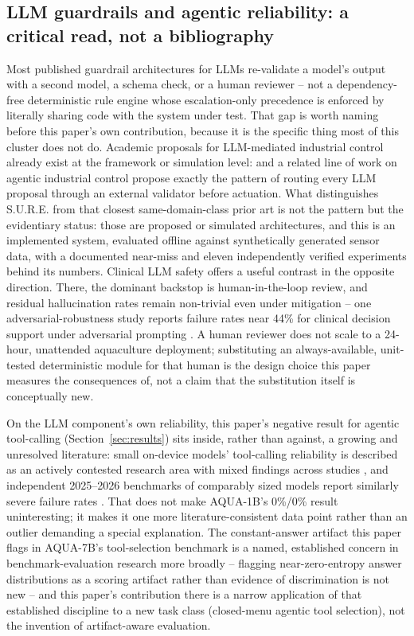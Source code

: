 \subsection{LLM guardrails and agentic reliability: a critical read, not a bibliography}

Most published guardrail architectures for LLMs re-validate a model's output with a second model,
a schema check, or a human reviewer -- not a dependency-free deterministic rule engine whose
escalation-only precedence is enforced by literally sharing code with the system under test. That
gap is worth naming before this paper's own contribution, because it is the specific thing most of
this cluster does not do. Academic proposals for LLM-mediated industrial control already exist at
the framework or simulation level: \citet{arxiv2024industrialllm} and a related line of work on
agentic industrial control \citep{arxiv2025agenticindustrial} propose exactly the pattern of
routing every LLM proposal through an external validator before actuation. What distinguishes
S.U.R.E. from that closest same-domain-class prior art is not the pattern but the evidentiary
status: those are proposed or simulated architectures, and this is an implemented system, evaluated
offline against synthetically generated sensor data, with a documented near-miss and eleven
independently verified experiments behind its numbers. Clinical
LLM safety offers a useful contrast in the opposite direction. There, the dominant backstop is
human-in-the-loop review, and residual hallucination rates remain non-trivial even under
mitigation -- one adversarial-robustness study reports failure rates near 44\% for clinical
decision support under adversarial prompting \citep{commsmed2025hallucination,bmc2026hallucination}.
A human reviewer does not scale to a 24-hour, unattended aquaculture deployment; substituting an
always-available, unit-tested deterministic module for that human is the design choice this paper
measures the consequences of, not a claim that the substitution itself is conceptually new.

On the LLM component's own reliability, this paper's negative result for agentic tool-calling
(Section~\ref{sec:results}) sits inside, rather than against, a growing and unresolved literature:
small on-device models' tool-calling reliability is described as an actively contested research
area with mixed findings across studies \citep{arxiv2510slmagentic}, and independent 2025--2026
benchmarks of comparably sized models report similarly severe failure rates
\citep{devto2026llama3b,arxiv2606toolenv}. That does not make AQUA-1B's 0\%/0\% result
uninteresting; it makes it one more literature-consistent data point rather than an outlier
demanding a special explanation. The constant-answer artifact this paper flags in AQUA-7B's
tool-selection benchmark is a named, established concern in benchmark-evaluation research more
broadly -- flagging near-zero-entropy answer distributions as a scoring artifact rather than
evidence of discrimination is not new \citep{arxiv2024artifacts} -- and this paper's contribution
there is a narrow application of that established discipline to a new task class (closed-menu
agentic tool selection), not the invention of artifact-aware evaluation.

